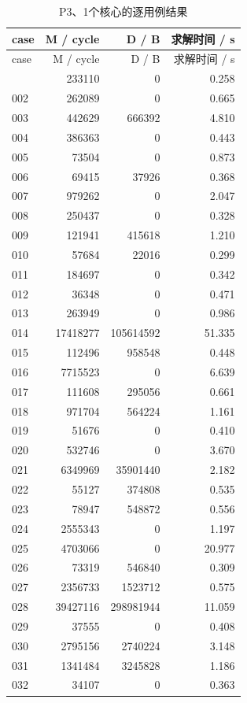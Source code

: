 \documentclass[anonymous,notoc]{gmcm2026}
\begin{document}
\begin{longtable}{lrrr}
\caption{P3、1个核心的逐用例结果}\\
\toprule
case & M / cycle & D / B & 求解时间 / s\\\midrule
\endfirsthead
\toprule
case & M / cycle & D / B & 求解时间 / s\\\midrule
\endhead
\bottomrule\endfoot
001 & 233110 & 0 & 0.258 \\
002 & 262089 & 0 & 0.665 \\
003 & 442629 & 666392 & 4.810 \\
004 & 386363 & 0 & 0.443 \\
005 & 73504 & 0 & 0.873 \\
006 & 69415 & 37926 & 0.368 \\
007 & 979262 & 0 & 2.047 \\
008 & 250437 & 0 & 0.328 \\
009 & 121941 & 415618 & 1.210 \\
010 & 57684 & 22016 & 0.299 \\
011 & 184697 & 0 & 0.342 \\
012 & 36348 & 0 & 0.471 \\
013 & 263949 & 0 & 0.986 \\
014 & 17418277 & 105614592 & 51.335 \\
015 & 112496 & 958548 & 0.448 \\
016 & 7715523 & 0 & 6.639 \\
017 & 111608 & 295056 & 0.661 \\
018 & 971704 & 564224 & 1.161 \\
019 & 51676 & 0 & 0.410 \\
020 & 532746 & 0 & 3.670 \\
021 & 6349969 & 35901440 & 2.182 \\
022 & 55127 & 374808 & 0.535 \\
023 & 78947 & 548872 & 0.556 \\
024 & 2555343 & 0 & 1.197 \\
025 & 4703066 & 0 & 20.977 \\
026 & 73319 & 546840 & 0.309 \\
027 & 2356733 & 1523712 & 0.575 \\
028 & 39427116 & 298981944 & 11.059 \\
029 & 37555 & 0 & 0.408 \\
030 & 2795156 & 2740224 & 3.148 \\
031 & 1341484 & 3245828 & 1.186 \\
032 & 34107 & 0 & 0.363 \\

\end{longtable}
\end{document}
